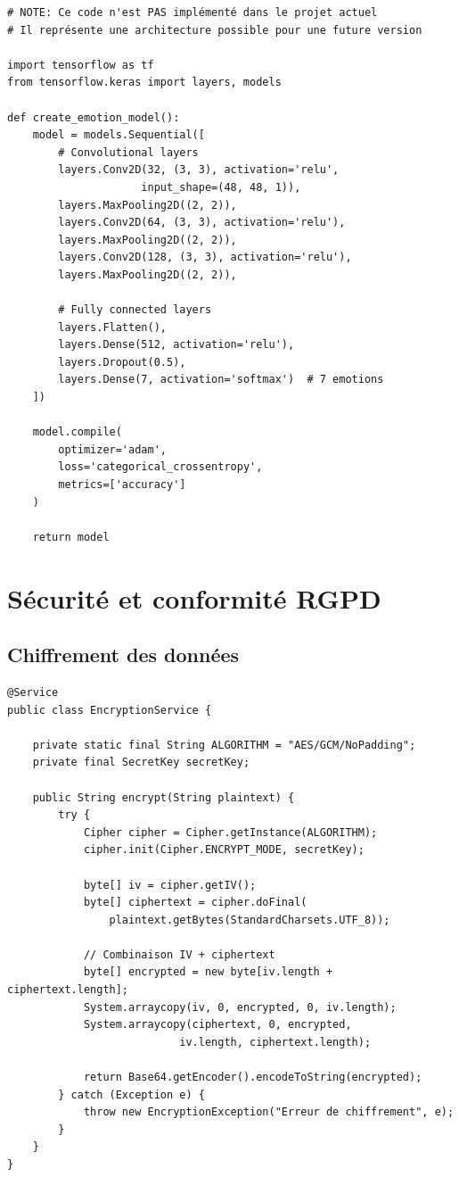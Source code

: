 \documentclass[a4paper,11pt]{report}
\begin{document}
\begin{lstlisting}[style=python, caption=Exemple théorique d'architecture CNN avec TensorFlow]
# NOTE: Ce code n'est PAS implémenté dans le projet actuel
# Il représente une architecture possible pour une future version

import tensorflow as tf
from tensorflow.keras import layers, models

def create_emotion_model():
    model = models.Sequential([
        # Convolutional layers
        layers.Conv2D(32, (3, 3), activation='relu', 
                     input_shape=(48, 48, 1)),
        layers.MaxPooling2D((2, 2)),
        layers.Conv2D(64, (3, 3), activation='relu'),
        layers.MaxPooling2D((2, 2)),
        layers.Conv2D(128, (3, 3), activation='relu'),
        layers.MaxPooling2D((2, 2)),
        
        # Fully connected layers
        layers.Flatten(),
        layers.Dense(512, activation='relu'),
        layers.Dropout(0.5),
        layers.Dense(7, activation='softmax')  # 7 emotions
    ])
    
    model.compile(
        optimizer='adam',
        loss='categorical_crossentropy',
        metrics=['accuracy']
    )
    
    return model
\end{lstlisting}

\section{Sécurité et conformité RGPD}

\subsection{Chiffrement des données}

\begin{lstlisting}[style=java, caption=Service de chiffrement pour données sensibles]
@Service
public class EncryptionService {
    
    private static final String ALGORITHM = "AES/GCM/NoPadding";
    private final SecretKey secretKey;
    
    public String encrypt(String plaintext) {
        try {
            Cipher cipher = Cipher.getInstance(ALGORITHM);
            cipher.init(Cipher.ENCRYPT_MODE, secretKey);
            
            byte[] iv = cipher.getIV();
            byte[] ciphertext = cipher.doFinal(
                plaintext.getBytes(StandardCharsets.UTF_8));
            
            // Combinaison IV + ciphertext
            byte[] encrypted = new byte[iv.length + ciphertext.length];
            System.arraycopy(iv, 0, encrypted, 0, iv.length);
            System.arraycopy(ciphertext, 0, encrypted, 
                           iv.length, ciphertext.length);
            
            return Base64.getEncoder().encodeToString(encrypted);
        } catch (Exception e) {
            throw new EncryptionException("Erreur de chiffrement", e);
        }
    }
}
\end{lstlisting}
\end{document}
